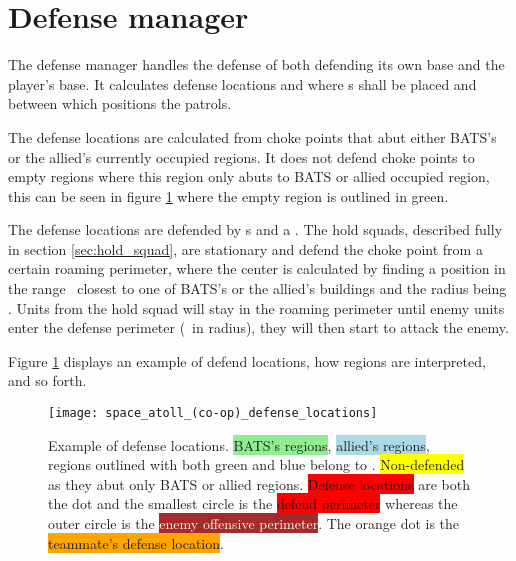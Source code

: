 \section{Defense manager}
\label{sec:defense_manager}
The defense manager handles the defense of both defending its own base and the player’s base. It calculates defense locations and where s shall be placed and between which positions the  patrols.

The defense locations are calculated from choke points that abut either BATS’s or the allied’s currently occupied regions. It does not defend choke points to empty regions where this region only abuts to BATS or allied occupied region, this can be seen in figure \ref{fig:defense_locations} where the empty region is outlined in green.

The defense locations are defended by s and a . The hold squads, described fully in section \ref{sec:hold_squad}, are stationary and defend the choke point from a certain roaming perimeter, where the center is calculated by finding a position in the range \squadDefendRoamDistanceMinMax~closest to one of BATS’s or the allied’s buildings and the radius being \squadDefendRoamPerimeter. Units from the hold squad will stay in the roaming perimeter until enemy units enter the defense perimeter (\squadDefendDefendPerimeter~in radius), they will then start to attack the enemy. 

Figure \ref{fig:defense_locations} displays an example of defend locations, how regions are interpreted, and so forth.

\begin{figure}[htb]
\centering
\texttt{[image: space\_atoll\_(co-op)\_defense\_locations]}
\caption{Example of defense locations. \colorbox{LightGreen}{BATS’s regions}, \colorbox{LightBlue}{allied’s regions}, regions outlined with both green and blue belong to . \colorbox{Yellow}{Non-defended} as they abut only BATS or allied regions. \colorbox{Red}{Defense locations} are both the dot and the smallest circle is the \colorbox{Red}{defend perimeter} whereas the outer circle is the \colorbox{Brown}{\textcolor{white}{enemy offensive perimeter}}. The orange dot is the \colorbox{Orange}{teammate's defense location}.}
\label{fig:defense_locations}
\end{figure}

